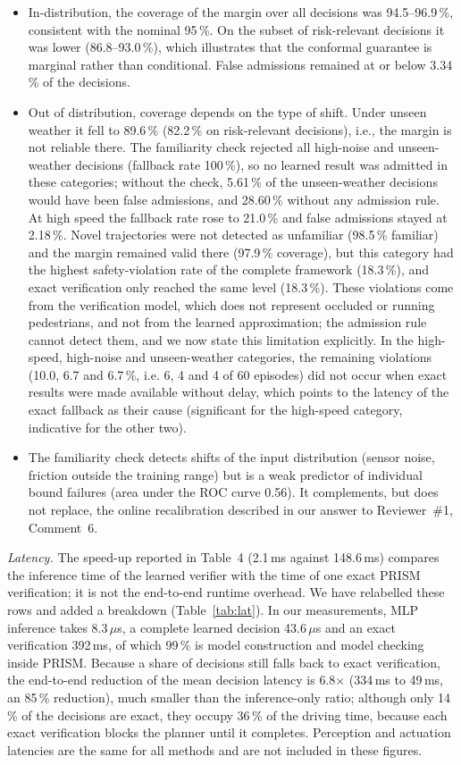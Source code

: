 \documentclass[11pt]{article}
\begin{document}
\begin{itemize}[leftmargin=1.3em,itemsep=1pt]
\item In-distribution, the coverage of the margin over all decisions was 94.5--96.9\,\%,
consistent with the nominal 95\,\%. On the subset of risk-relevant decisions it was lower
(86.8--93.0\,\%), which illustrates that the conformal guarantee is
marginal rather than conditional. False admissions remained at or below 3.34\,\% of the decisions.
\item Out of distribution, coverage depends on the type of shift. Under unseen weather it fell to 89.6\,\%
(82.2\,\% on risk-relevant decisions), i.e., the margin is not reliable there. The familiarity check
rejected all high-noise and unseen-weather decisions (fallback rate 100\,\%), so no learned result was admitted in these categories;
without the check, 5.61\,\% of the unseen-weather decisions would have been false admissions, and
28.60\,\% without any admission rule. At high speed the fallback rate rose to 21.0\,\% and false admissions stayed at
2.18\,\%. Novel trajectories were not detected as unfamiliar
(98.5\,\% familiar) and the margin remained valid there (97.9\,\% coverage),
but this category had the highest safety-violation rate of the complete framework (18.3\,\%), and exact
verification only reached the same level (18.3\,\%). These violations come from the verification model, which does
not represent occluded or running pedestrians, and not from the learned approximation; the admission rule cannot detect them, and we
now state this limitation explicitly. In the high-speed, high-noise and unseen-weather categories, the remaining violations
(10.0, 6.7 and 6.7\,\%, i.e. 6, 4 and 4 of 60 episodes) did not occur when exact
results were made available without delay, which points to the latency of the exact fallback as their cause (significant for the high-speed category,
indicative for the other two).
\item The familiarity check detects shifts of the input distribution (sensor noise, friction outside the training range) but is a
weak predictor of individual bound failures (area under the ROC curve 0.56). It complements, but does not replace,
the online recalibration described in our answer to Reviewer~\#1, Comment~6.
\end{itemize}
\emph{Latency.} The speed-up reported in Table~4 (2.1\,ms against 148.6\,ms) compares the inference time of the learned verifier
with the time of one exact PRISM verification; it is not the end-to-end runtime overhead. We have relabelled these rows and added a
breakdown (Table~\ref{tab:lat}). In our measurements, MLP inference takes 8.3\,$\mu$s, a complete
learned decision 43.6\,$\mu$s and an exact verification 392\,ms, of which
99\,\% is model construction and model checking inside PRISM. Because a share of decisions still falls back to
exact verification, the end-to-end reduction of the mean decision latency is 6.8$\times$
(334\,ms to 49\,ms, an 85\,\% reduction), much smaller than the
inference-only ratio; although only 14\,\% of the decisions are exact, they occupy 36\,\% of the driving time,
because each exact verification blocks the planner until it completes. Perception and actuation latencies are the same for all methods and are not included in these figures.
\end{document}
